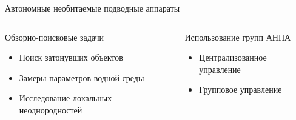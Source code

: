 \documentclass{beamer}
\begin{document}
\begin{frame}{Автономные необитаемые подводные аппараты}

 \begin{columns}[onlytextwidth, t]
    \begin{column}{0.5\textwidth}

        Обзорно-поисковые задачи
        \begin{itemize}
        \item Поиск затонувших объектов
        \item Замеры параметров водной среды
        \item Исследование локальных неоднородностей
        \end{itemize}
    \end{column}

    \begin{column}{0.1\textwidth}
    \end{column}

    \begin{column}{0.4\textwidth}

        Использование групп АНПА
        \begin{itemize}
        \item Централизованное управление
        \item Групповое управление
        \end{itemize}

    \end{column}

​\end{columns}



\end{frame}
\end{document}
